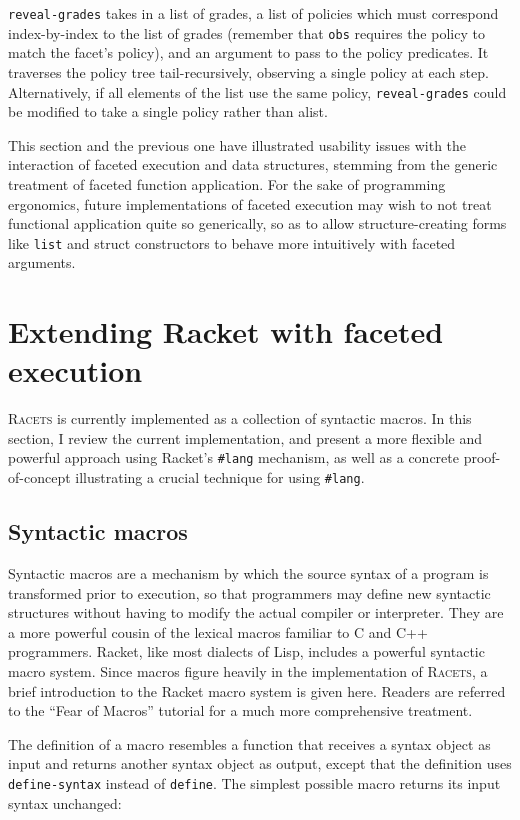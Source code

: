 \documentclass{article}
\begin{document}
\texttt{reveal-grades} takes in a list of grades, a list of policies which must correspond index-by-index to the list of grades (remember that \texttt{obs} requires the policy to match the facet's policy), and an argument to pass to the policy predicates. It traverses the policy tree tail-recursively, observing a single policy at each step. Alternatively, if all elements of the list use the same policy, \texttt{reveal-grades} could be modified to take a single policy rather than alist.

This section and the previous one have illustrated usability issues with the interaction of faceted execution and data structures, stemming from the generic treatment of faceted function application. For the sake of programming ergonomics, future implementations of faceted execution may wish to not treat functional application quite so generically, so as to allow structure-creating forms like \texttt{list} and struct constructors to behave more intuitively with faceted arguments.



\section{Extending Racket with faceted execution\label{sec:lang}}
\textsc{Racets} is currently implemented as a collection of syntactic macros. In this section, I review the current implementation, and present a more flexible and powerful approach using Racket's \texttt{\#lang} mechanism, as well as a concrete proof-of-concept illustrating a crucial technique for using \texttt{\#lang}.


\subsection{Syntactic macros}
Syntactic macros are a mechanism by which the source syntax of a program is transformed prior to execution, so that programmers may define new syntactic structures without having to modify the actual compiler or interpreter. They are a more powerful cousin of the lexical macros familiar to C and C++ programmers. Racket, like most dialects of Lisp, includes a powerful syntactic macro system. Since macros figure heavily in the implementation of \textsc{Racets}, a brief introduction to the Racket macro system is given here. Readers are referred to the ``Fear of Macros'' tutorial \cite{fear-of-macros} for a much more comprehensive treatment.

The definition of a macro resembles a function that receives a syntax object as input and returns another syntax object as output, except that the definition uses \texttt{define-syntax} instead of \texttt{define}. The simplest possible macro returns its input syntax unchanged:
\end{document}
